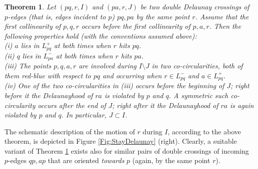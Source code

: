 \documentclass[letter,11pt]{article}
\newtheorem{theorem}{Theorem}[section]
\def \L{{L}}
\begin{document}
\begin{theorem}\label{Thm:OrderSpecialCrossings}
Let $(pq,r,I)$ and $(pa,r,J)$ be two double Delaunay crossings of $p$-edges (that is, edges incident to $p$) $pq,pa$ by the same point $r$. 
Assume that
the first collinearity of $p,q,r$ occurs before the first collinearity of $p,a,r$.
Then the following properties hold (with the conventions assumed above):\\
\indent(i) $a$ lies in $\L_{pq}^+$ at both times when $r$ hits $pq$.\\
\indent (ii) $q$ lies in $\L_{pa}^-$ at both times when $r$ hits $pa$.\\
\indent (iii) The points $p,q,a,r$ are involved during $I\setminus J$ in two co-circularities, both of them red-blue with respect to $pq$ and occurring when $r\in \L^-_{pq}$ and $a\in \L^+_{pq}$. \\
\indent (iv) One of the two co-circularities in (iii) occurs before the beginning of $J$; right before it the Delaunayhood of $ra$ is violated by $p$ and $q$. A symmetric such co-circularity occurs after the end of $J$;
right after it the Delaunayhood of $ra$ is again violated by $p$ and $q$.
In particular, $J\subset I$.
\end{theorem}
The schematic description of the motion of $r$ during $I$, according to the above theorem, is depicted in Figure \ref{Fig:StayDelaunay} (right).
Clearly, a suitable variant of Theorem \ref{Thm:OrderSpecialCrossings} exists also for similar pairs of double crossings of incoming $p$-edges $qp,ap$ that are oriented {\it towards} $p$ (again, by the same point $r$).
\end{document}

